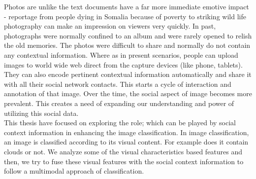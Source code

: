 \hspace*{1cm}Photos are unlike the text documents have a far more immediate emotive impact - reportage from people dying in Somalia because of poverty to striking wild life photography can make an impression on viewers very quickly. In past, photographs were normally confined to an album and were rarely opened to relish the old memories. The photos were difficult to share and normally do not contain any contextual information. Where as in present scenarios, people can upload images to world wide web direct from the capture devices (like phone, tablets). They can also encode pertinent contextual information automatically and share it with all their social network contacts. This starts a cycle of interaction and annotation of that image. Over the time, the social aspect of image becomes more prevalent. This creates a need of expanding our understanding and power of utilizing this social data.\\
This thesis have focused on exploring the role; which can be played by social context information in enhancing the image classification. In image classification, an image is classified according to its visual content. For example does it contain clouds or not. We analyze some of the visual characteristics based features and then, we try to fuse these visual features with the social context information to follow a multimodal approach of classification. \\
